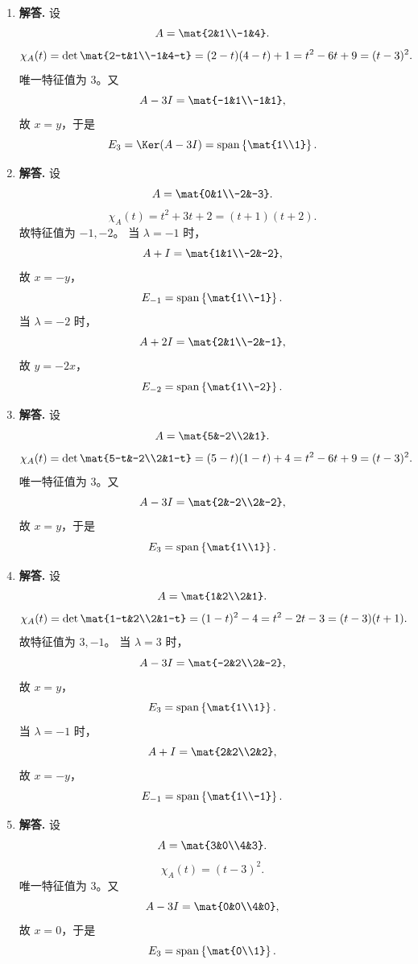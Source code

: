 \begin{enumerate}[label=\textbf{\arabic*.}, leftmargin=*, itemsep=1em]
\item \textbf{解答.} 设
\[
A=\mat{2&1\\-1&4}.
\]
\[
\chi_A(t)=\det\mat{2-t&1\\-1&4-t}=(2-t)(4-t)+1=t^2-6t+9=(t-3)^2.
\]
唯一特征值为 \(3\)。又
\[
A-3I=\mat{-1&1\\-1&1},
\]
故 \(x=y\)，于是
\[
E_3=\Ker(A-3I)=\operatorname{span}\left\{\mat{1\\1}\right\}.
\]

\item \textbf{解答.} 设
\[
A=\mat{0&1\\-2&-3}.
\]
\[
\chi_A(t)=t^2+3t+2=(t+1)(t+2).
\]
故特征值为 \(-1,-2\)。  
当 \(\lambda=-1\) 时，
\[
A+I=\mat{1&1\\-2&-2},
\]
故 \(x=-y\)，
\[
E_{-1}=\operatorname{span}\left\{\mat{1\\-1}\right\}.
\]
当 \(\lambda=-2\) 时，
\[
A+2I=\mat{2&1\\-2&-1},
\]
故 \(y=-2x\)，
\[
E_{-2}=\operatorname{span}\left\{\mat{1\\-2}\right\}.
\]

\item \textbf{解答.} 设
\[
A=\mat{5&-2\\2&1}.
\]
\[
\chi_A(t)=\det\mat{5-t&-2\\2&1-t}=(5-t)(1-t)+4=t^2-6t+9=(t-3)^2.
\]
唯一特征值为 \(3\)。又
\[
A-3I=\mat{2&-2\\2&-2},
\]
故 \(x=y\)，于是
\[
E_3=\operatorname{span}\left\{\mat{1\\1}\right\}.
\]

\item \textbf{解答.} 设
\[
A=\mat{1&2\\2&1}.
\]
\[
\chi_A(t)=\det\mat{1-t&2\\2&1-t}=(1-t)^2-4=t^2-2t-3=(t-3)(t+1).
\]
故特征值为 \(3,-1\)。  
当 \(\lambda=3\) 时，
\[
A-3I=\mat{-2&2\\2&-2},
\]
故 \(x=y\)，
\[
E_3=\operatorname{span}\left\{\mat{1\\1}\right\}.
\]
当 \(\lambda=-1\) 时，
\[
A+I=\mat{2&2\\2&2},
\]
故 \(x=-y\)，
\[
E_{-1}=\operatorname{span}\left\{\mat{1\\-1}\right\}.
\]

\item \textbf{解答.} 设
\[
A=\mat{3&0\\4&3}.
\]
\[
\chi_A(t)=(t-3)^2.
\]
唯一特征值为 \(3\)。又
\[
A-3I=\mat{0&0\\4&0},
\]
故 \(x=0\)，于是
\[
E_3=\operatorname{span}\left\{\mat{0\\1}\right\}.
\]


\end{enumerate}
